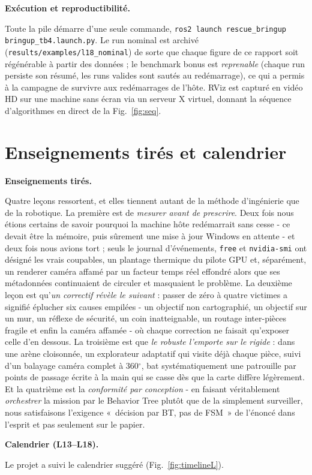 \documentclass[11pt,a4paper]{article}
\newcommand{\head}[1]{\par\smallskip\noindent\textbf{\color{nccblue}#1}\par}
\begin{document}
\head{Exécution et reproductibilité.} Toute la pile démarre d'une seule commande,
\texttt{ros2 launch rescue\_bringup bringup\_tb4.launch.py}. Le run nominal est archivé
(\texttt{results/examples/l18\_nominal}) de sorte que chaque figure de ce rapport soit régénérable à
partir des données ; le benchmark bonus est \emph{reprenable} (chaque run persiste son résumé, les runs
valides sont sautés au redémarrage), ce qui a permis à la campagne de survivre aux redémarrages de
l'hôte. RViz est capturé en vidéo HD sur une machine sans écran via un serveur X virtuel, donnant la
séquence d'algorithmes en direct de la Fig.~\ref{fig:seq}.

\section{Enseignements tirés et calendrier}
\head{Enseignements tirés.} Quatre leçons ressortent, et elles tiennent autant de la méthode d'ingénierie
que de la robotique. La première est de \emph{mesurer avant de prescrire}. Deux fois nous étions certains
de savoir pourquoi la machine hôte redémarrait sans cesse - ce devait être la mémoire, puis sûrement une
mise à jour Windows en attente - et deux fois nous avions tort ; seuls le journal d'événements,
\texttt{free} et \texttt{nvidia-smi} ont désigné les vrais coupables, un plantage thermique du pilote GPU
et, séparément, un renderer caméra affamé par un facteur temps réel effondré alors que ses métadonnées
continuaient de circuler et masquaient le problème. La deuxième leçon est qu'\emph{un correctif révèle le
suivant} : passer de zéro à quatre victimes a signifié éplucher six causes empilées - un objectif non
cartographié, un objectif sur un mur, un réflexe de sécurité, un coin inatteignable, un routage
inter-pièces fragile et enfin la caméra affamée - où chaque correction ne faisait qu'exposer celle d'en
dessous. La troisième est que \emph{le robuste l'emporte sur le rigide} : dans une arène cloisonnée, un
explorateur adaptatif qui visite déjà chaque pièce, suivi d'un balayage caméra complet à 360$^\circ$,
bat systématiquement une patrouille par points de passage écrite à la main qui se casse dès que la carte
diffère légèrement. Et la quatrième est la \emph{conformité par conception} - en faisant véritablement
\emph{orchestrer} la mission par le Behavior Tree plutôt que de la simplement surveiller, nous satisfaisons
l'exigence «~décision par BT, pas de FSM~» de l'énoncé dans l'esprit et pas seulement sur le papier.

\head{Calendrier (L13--L18).} Le projet a suivi le calendrier suggéré (Fig.~\ref{fig:timelineL}).
\end{document}
